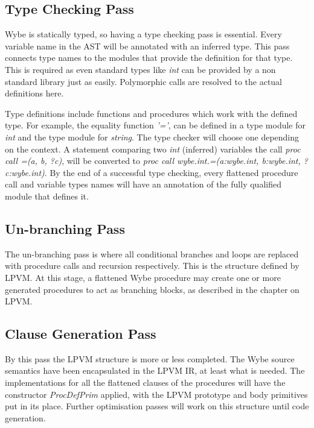 \subsection{Type Checking Pass}

Wybe is statically typed, so having a type checking pass is essential. Every
variable name in the AST will be annotated with an inferred type. This pass
connects type names to the modules that provide the definition for that
type. This is required as even standard types like \textit{int} can be provided
by a non standard library just as easily. Polymorphic calls are resolved to the
actual definitions here.

Type definitions include functions and procedures which work with the defined
type. For example, the equality function \textit{'='}, can be defined in a type
module for \textit{int} and the type module for \textit{string}. The type
checker will choose one depending on the context. A statement comparing two
\textit{int} (inferred) variables the call \textit{proc call =(a, b, ?c)}, will
be converted to \textit{proc call wybe.int.=(a:wybe.int, b:wybe.int,
  ?c:wybe.int)}. By the end of a successful type checking, every flattened
procedure call and variable types names will have an annotation of the fully
qualified module that defines it.


\subsection{Un-branching Pass}

The un-branching pass is where all conditional branches and loops are replaced
with procedure calls and recursion respectively. This is the structure defined
by LPVM. At this stage, a flattened Wybe procedure may create one or more
generated procedures to act as branching blocks, as described in the chapter on
LPVM.


\subsection{Clause Generation Pass}

By this pass the LPVM structure is more or less completed. The Wybe source
semantics have been encapsulated in the LPVM IR, at least what is needed. The
implementations for all the flattened clauses of the procedures will have the
constructor \textit{ProcDefPrim} applied, with the LPVM prototype and body
primitives put in its place. Further optimisation passes will work on this
structure until code generation.


